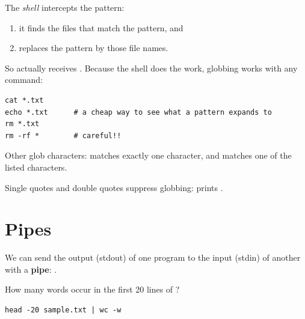 The \emph{shell} intercepts the pattern:
\begin{enumerate}
  \item it finds the files that match the pattern, and
  \item replaces the pattern by those file names.
\end{enumerate}
So  actually receives . Because the
shell does the work, globbing works with any command:
\begin{center}
\end{center}
\begin{lstlisting}[style=bash]
cat *.txt
echo *.txt      # a cheap way to see what a pattern expands to
rm *.txt
rm -rf *        # careful!!
\end{lstlisting}
Other glob characters:  matches exactly one character, and \code{[abc]}
matches one of the listed characters.

\begin{important}[Quoting]
Single quotes and double quotes suppress globbing:  prints
.
\end{important}

\section{Pipes}
We can send the output (stdout) of one program to the input (stdin) of another
with a \textbf{pipe}: .

\begin{example}
How many words occur in the first 20 lines of ?
\begin{lstlisting}[style=bash]
head -20 sample.txt | wc -w
\end{lstlisting}
\end{example}

